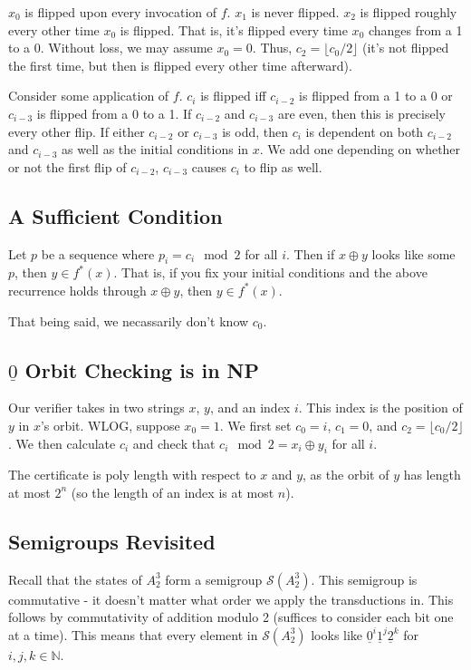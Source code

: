 \documentclass{article}
\newcommand{\0}{\underline{0}}
\newcommand{\1}{\underline{1}}
\newcommand{\2}{\underline{2}}
\newcommand{\N}{\mathbb{N}}
\renewcommand{\S}{\mathcal{S}}
\begin{document}
$x_0$ is flipped upon every invocation of $f$. $x_1$ is never flipped. $x_2$ is flipped roughly every other time $x_0$ is flipped. That is, it's flipped every time $x_0$ changes from a 1 to a 0. Without loss, we may assume $x_0 = 0$. Thus, $c_2 = \lfloor c_0 / 2 \rfloor$ (it's not flipped the first time, but then is flipped every other time afterward).

Consider some application of $f$. $c_i$ is flipped iff $c_{i-2}$ is flipped from a 1 to a 0 or $c_{i-3}$ is flipped from a 0 to a 1. If $c_{i-2}$ and $c_{i-3}$ are even, then this is precisely every other flip. If either $c_{i-2}$ or $c_{i-3}$ is odd, then $c_i$ is dependent on both $c_{i-2}$ and $c_{i-3}$ as well as the initial conditions in $x$. We add one depending on whether or not the first flip of $c_{i-2}$, $c_{i-3}$ causes $c_i$ to flip as well.

\subsection*{A Sufficient Condition}
Let $p$ be a sequence where $p_i = c_i \mod{2}$ for all $i$. Then if $x \oplus y$ looks like some $p$, then $y \in f^*(x)$. That is, if you fix your initial conditions and the above recurrence holds through $x \oplus y$, then $y \in f^*(x)$.

That being said, we necassarily don't know $c_0$.

\subsection*{$\0$ Orbit Checking is in NP}
Our verifier takes in two strings $x$, $y$, and an index $i$. This index is the position of $y$ in $x$'s orbit. WLOG, suppose $x_0 = 1$. We first set $c_0 = i$, $c_1 = 0$, and $c_2 = \lfloor c_0 / 2 \rfloor$. We then calculate $c_i$ and check that $c_i \mod 2 = x_i \oplus y_i$ for all $i$.

The certificate is poly length with respect to $x$ and $y$, as the orbit of $y$ has length at most $2^n$ (so the length of an index is at most $n$).



\subsection*{Semigroups Revisited}
Recall that the states of $A^3_2$ form a semigroup $\S(A^3_2)$. This semigroup is commutative - it doesn't matter what order we apply the transductions in. This follows by commutativity of addition modulo 2 (suffices to consider each bit one at a time). This means that every element in $\S(A^3_2)$ looks like $\0^i \1^j\2^k$ for $i, j, k \in \N$.
\end{document}
